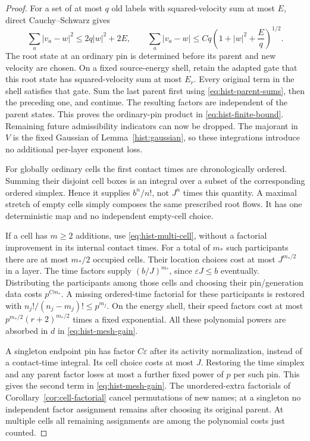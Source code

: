 \begin{proof}
For a set of at most $q$ old labels with squared-velocity sum at most
$E$, direct Cauchy--Schwarz gives
\begin{equation}
 \sum_a|v_a-w|^2\leq2q|w|^2+2E,\qquad
 \sum_a|v_a-w|
       \leq Cq\left(1+|w|^2+\frac E q\right)^{1/2}.
 \label{eq:hist-parent-sums}
\end{equation}
The root state at an ordinary pin is determined before its parent and
new velocity are chosen.  On a fixed source-energy shell, retain the
adapted gate that this root state has squared-velocity sum at most
$E_r$.  Every original term in the shell satisfies that gate.  Sum
the last parent first using \eqref{eq:hist-parent-sums}, then the
preceding one, and continue.  The resulting factors are independent
of the parent states.  This proves the ordinary-pin product in
\eqref{eq:hist-finite-bound}.  Remaining future admissibility indicators
can now be dropped.  The majorant in $V$ is the fixed Gaussian of
Lemma~\ref{hist:gaussian}, so these integrations introduce no additional
per-layer exponent loss.

For globally ordinary cells the first contact times are chronologically
ordered.  Summing their disjoint cell boxes is an integral over a
subset of the corresponding ordered simplex.  Hence it supplies
$b^{n}/n!$, not $J^n$ times this quantity.  A maximal stretch of empty
cells simply composes the same prescribed root flows.  It has one
deterministic map and no independent empty-cell choice.

If a cell has $m\geq2$ additions, use
\eqref{eq:hist-multi-cell}, without a factorial improvement in its
internal contact times.  For a total of $m_*$ such participants there
are at most $m_*/2$ occupied cells.  Their location choices cost at
most $J^{m_*/2}$ in a layer.  The time factors supply
$(b/J)^{m_*}$, since $\varepsilon J\leq b$ eventually.  Distributing
the participants among those cells and choosing their pin/generation
data costs $p^{C m_*}$.  A missing ordered-time factorial for these
participants is restored with
$n_j!/(n_j-m_j)!\leq p^{m_j}$.  On the energy shell, their speed
factors cost at most $p^{m_*/2}(r+2)^{m_*/2}$ times a fixed exponential.
All these polynomial powers are absorbed in $d$ in
\eqref{eq:hist-mesh-gain}.

A singleton endpoint pin has factor $C\varepsilon$ after its activity
normalization, instead of a contact-time integral.  Its cell choice
costs at most $J$.  Restoring the time simplex and any parent factor
loses at most a further fixed power of $p$ per such pin.  This gives
the second term in \eqref{eq:hist-mesh-gain}.  The unordered-extra
factorials of Corollary~\ref{cor:cell-factorial} cancel permutations of
new names; at a singleton no independent factor assignment remains
after choosing its original parent.  At multiple cells all remaining
assignments are among the polynomial costs just counted.


\end{proof}
